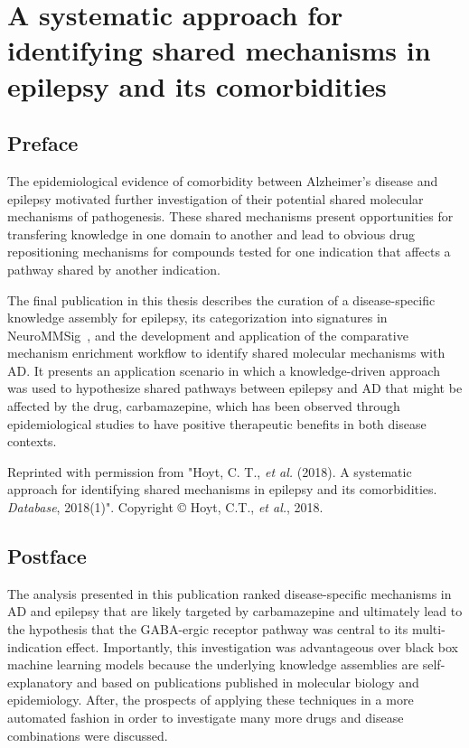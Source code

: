 \chapter{A systematic approach for identifying shared mechanisms in epilepsy and its comorbidities}
\label{ch:epicom}

\section*{Preface}

The epidemiological evidence of comorbidity between Alzheimer's disease and epilepsy motivated further investigation of their potential shared molecular mechanisms of pathogenesis.
These shared mechanisms present opportunities for transfering knowledge in one domain to another and lead to obvious drug repositioning mechanisms for compounds tested for one indication that affects a pathway shared by another indication.

The final publication in this thesis describes the curation of a disease-specific knowledge assembly for epilepsy, its categorization into signatures in NeuroMMSig~\cite{Domingo-Fernandez2017}, and the development and application of the comparative mechanism enrichment workflow to identify shared molecular mechanisms with \ac{AD}.
It presents an application scenario in which a knowledge-driven approach was used to hypothesize shared pathways between epilepsy and \ac{AD} that might be affected by the drug, carbamazepine, which has been observed through epidemiological studies to have positive therapeutic benefits in both disease contexts.

\vspace*{\fill}

Reprinted with permission from "Hoyt, C. T., \textit{et al.} (2018). A systematic approach for identifying shared mechanisms in epilepsy and its comorbidities. \textit{Database}, 2018(1)".
Copyright © Hoyt, C.T., \textit{et al.}, 2018.



\section*{Postface}

The analysis presented in this publication ranked disease-specific mechanisms in \ac{AD} and epilepsy that are likely targeted by carbamazepine and ultimately lead to the hypothesis that the GABA-ergic receptor pathway was central to its multi-indication effect.
Importantly, this investigation was advantageous over black box machine learning models because the underlying knowledge assemblies are self-explanatory and based on publications published in molecular biology and epidemiology.
After, the prospects of applying these techniques in a more automated fashion in order to investigate many more drugs and disease combinations were discussed.

